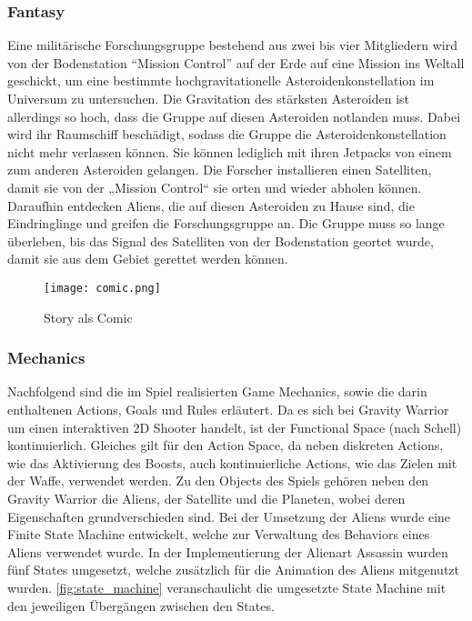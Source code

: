\documentclass[11pt]{scrartcl}
\begin{document}
\newpage
\subsubsection{Fantasy}
\label{subsec:fan}
Eine militärische Forschungsgruppe bestehend aus zwei bis vier Mitgliedern wird von der Bodenstation “Mission Control” auf der Erde auf eine Mission ins Weltall geschickt, um eine bestimmte hochgravitationelle Asteroidenkonstellation im Universum zu untersuchen. Die Gravitation des stärksten Asteroiden ist allerdings so hoch, dass die Gruppe auf diesen Asteroiden notlanden muss. Dabei wird ihr Raumschiff beschädigt, sodass die Gruppe die Asteroidenkonstellation nicht mehr verlassen können. Sie können lediglich mit ihren Jetpacks von einem zum anderen Asteroiden gelangen. Die Forscher installieren einen Satelliten, damit sie von der „Mission Control“ sie orten und wieder abholen können. Daraufhin entdecken Aliens, die auf diesen Asteroiden zu Hause sind, die Eindringlinge und greifen die Forschungsgruppe an. Die Gruppe muss so lange überleben, bis das Signal des Satelliten von der Bodenstation geortet wurde, damit sie aus dem Gebiet gerettet werden können.

\begin{figure}[htp]
	\centering
	\texttt{[image: comic.png]}
	\caption{Story als Comic}
	\label{fig:comic}
\end{figure}

\subsubsection{Mechanics}
\label{subsec:mec}
Nachfolgend sind die im Spiel realisierten Game Mechanics, sowie die darin enthaltenen Actions, Goals und Rules erläutert. Da es sich bei Gravity Warrior um einen interaktiven 2D Shooter handelt, ist der Functional Space (nach Schell) kontinuierlich. Gleiches gilt für den Action Space, da neben diskreten Actions, wie das Aktivierung des Boosts, auch kontinuierliche Actions, wie das Zielen mit der Waffe, verwendet werden. Zu den Objects des Spiels gehören neben den Gravity Warrior die Aliens, der Satellite und die Planeten, wobei deren Eigenschaften grundverschieden sind. Bei der Umsetzung der Aliens wurde eine Finite State Machine entwickelt, welche zur Verwaltung des Behaviors eines Aliens verwendet wurde. In der Implementierung der Alienart Assassin wurden fünf States umgesetzt, welche zusätzlich für die Animation des Aliens mitgenutzt wurden. \autoref{fig:state_machine} veranschaulicht die umgesetzte State Machine mit den jeweiligen Übergängen zwischen den States.
\end{document}
